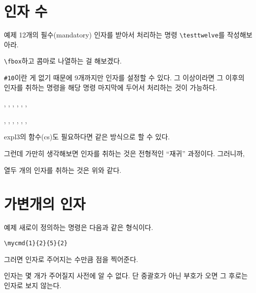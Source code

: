 \documentclass[a4paper,amsmath]{oblivoir}
\begin{document}
\section{인자 수}

\begin{questiona}{예제}
12개의 필수(mandatory) 인자를 받아서 처리하는 명령 \verb|\testtwelve|를 작성해보아라.
\end{questiona}

\verb|\fbox|하고 콤마로 나열하는 걸 해보겠다.

\verb|#10|이란 게 없기 때문에 9개까지만 인자를 설정할 수 있다.
그 이상이라면 그 이후의 인자를 취하는 명령을 해당 명령 마지막에 두어서
처리하는 것이 가능하다.

\begin{examplebelow}
\ExplSyntaxOn
\NewDocumentCommand {}
{
    , , , ,
    , ,
    \testtwelvenext
}

\NewDocumentCommand {}
{
    , , , ,
    , ,
}
\ExplSyntaxOff


\end{examplebelow}

expl3의 함수(cs)도 필요하다면 같은 방식으로 할 수 있다.

그런데 가만히 생각해보면 인자를 취하는 것은 전형적인 “재귀” 과정이다. 그러니까,

열두 개의 인자를 취하는 것은 위와 같다.


\section{가변개의 인자}

\begin{questiona}{예제}
새로이 정의하는 명령은 다음과 같은 형식이다.
\begin{verbatim}
\mycmd{1}{2}{5}{2}
\end{verbatim}
그러면 인자로 주어지는 수만큼 점을 찍어준다.

\textbullet \quad
\textbullet \textbullet \quad
\textbullet \textbullet \textbullet \textbullet \textbullet \quad
\textbullet \textbullet 

인자는 몇 개가 주어질지 사전에 알 수 없다. 단 중괄호가 아닌 부호가 오면 그 후로는 인자로 보지 않는다.
\end{questiona}
\end{document}
